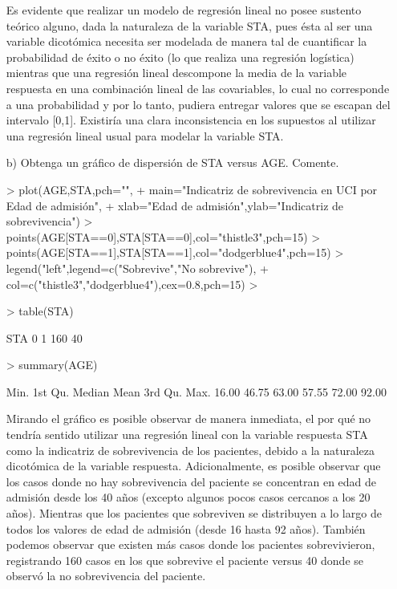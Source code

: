 \documentclass[11pt,onside]{article}
\begin{document}
\begin{itemize}
Es evidente que realizar un modelo de regresión lineal no posee sustento teórico alguno, dada la naturaleza de la variable STA, pues ésta al ser una variable dicotómica necesita ser modelada de manera tal de cuantificar la probabilidad de éxito o no éxito (lo que realiza una regresión logística) mientras que una regresión lineal descompone la media de la variable respuesta en una combinación lineal de las covariables, lo cual no corresponde a una probabilidad y por lo tanto, pudiera entregar valores que se escapan del intervalo [0,1]. Existiría una clara inconsistencia en los supuestos al utilizar una regresión lineal usual para modelar la variable STA.

\item[b)] Obtenga un gráfico de dispersión de STA versus AGE. Comente.


\begin{Schunk}
\begin{Sinput}
> plot(AGE,STA,pch="",
+      main="Indicatriz de sobrevivencia en UCI por Edad de admisión",
+      xlab="Edad de admisión",ylab="Indicatriz de sobrevivencia")
> points(AGE[STA==0],STA[STA==0],col="thistle3",pch=15)
> points(AGE[STA==1],STA[STA==1],col="dodgerblue4",pch=15)
> legend("left",legend=c("Sobrevive","No sobrevive"),
+        col=c("thistle3","dodgerblue4"),cex=0.8,pch=15)
> 
\end{Sinput}
\end{Schunk}


\begin{Schunk}
\begin{Sinput}
> table(STA)
\end{Sinput}
\begin{Soutput}
STA
  0   1 
160  40 
\end{Soutput}
\begin{Sinput}
> summary(AGE)
\end{Sinput}
\begin{Soutput}
   Min. 1st Qu.  Median    Mean 3rd Qu.    Max. 
  16.00   46.75   63.00   57.55   72.00   92.00 
\end{Soutput}
\end{Schunk}

Mirando el gráfico es posible observar de manera inmediata, el por qué no tendría sentido utilizar una regresión lineal con la variable respuesta STA como la indicatriz de sobrevivencia de los pacientes, debido a la naturaleza dicotómica de la variable respuesta. Adicionalmente, es posible observar que los casos donde no hay sobrevivencia del paciente se concentran en edad de admisión desde los 40 años (excepto algunos pocos casos cercanos a los 20 años). Mientras que los pacientes que sobreviven se distribuyen a lo largo de todos los valores de edad de admisión (desde 16 hasta 92 años). También podemos observar que existen más casos donde los pacientes sobrevivieron, registrando 160 casos en los que sobrevive el paciente versus 40 donde se observó la no sobrevivencia del paciente.


\end{itemize}
\end{document}
